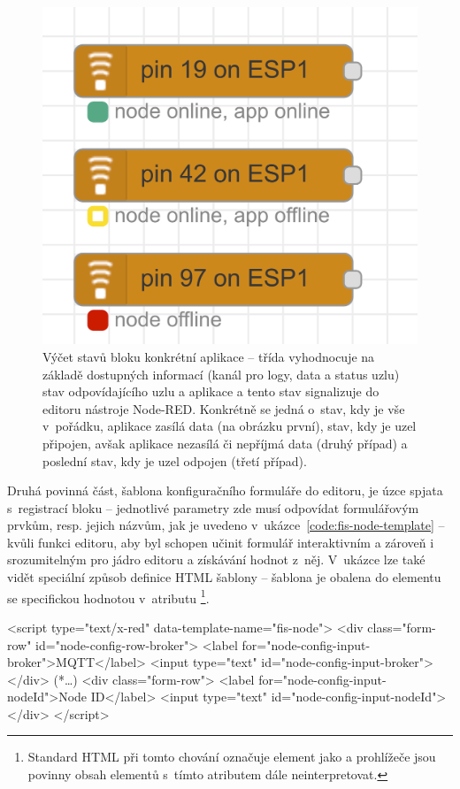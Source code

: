 \begin{figure}
    \centering
    \includegraphics[width=.5\textwidth]{figures/fis-node-status.png}
    \caption{Výčet stavů bloku konkrétní aplikace -- třída  vyhodnocuje na základě dostupných informací
    (kanál pro logy, data a status uzlu) stav odpovídajícího uzlu a aplikace a tento stav signalizuje do editoru
    nástroje Node-RED. Konkrétně se jedná o~stav, kdy je vše v~pořádku, aplikace zasílá data (na obrázku první),
    stav, kdy je uzel připojen, avšak aplikace nezasílá či nepříjmá data (druhý případ) a poslední stav,
    kdy je uzel odpojen (třetí případ).}
    \label{fig:fis-node-status}
\end{figure}

Druhá povinná část, šablona konfiguračního formuláře do editoru, je úzce spjata s~registrací bloku -- jednotlivé
parametry zde musí odpovídat formulářovým prvkům, resp. jejich názvům, jak je uvedeno
v~ukázce~\ref{code:fis-node-template} -- kvůli funkci editoru, aby byl schopen učinit
formulář interaktivním a zároveň i srozumitelným pro jádro editoru a získávání hodnot z~něj.
V~ukázce lze také vidět speciální způsob definice HTML šablony -- šablona je obalena do elementu  se
specifickou hodnotou v~atributu \footnote{Standard HTML při tomto chování označuje
element  jako  a prohlížeče jsou povinny obsah elementů s~tímto atributem dále
neinterpretovat.}.

\begin{code}[
    language=HTML,
    label=code:fis-node-template,
    caption={Ukázka z~implementace druhé povinné části deklarace bloku -- šablona formuláře v~jazyce HTML obsahuje
    jednotlivé vstupní pro pole pro korespondující parametry definovené v~registraci bloku do editoru
    v~ukázce~\ref{code:fis-node-constructor}.
    Atribut \ic{id="node-config-input-broker"} (a odpovídající) jsou důležité vzhledem k~chování editoru, nutná je shoda
    s~názvem parametru při registraci bloku -- stejně jako správné spárování šablony pomocí atributu
    \ic{data-template-name="fis-node"}.},
]
<script type="text/x-red" data-template-name="fis-node">
    <div class="form-row" id="node-config-row-broker">
        <label for="node-config-input-broker">MQTT</label>
        <input type="text" id="node-config-input-broker">
    </div>
    (*\ldots*)
    <div class="form-row">
        <label for="node-config-input-nodeId">Node ID</label>
        <input type="text" id="node-config-input-nodeId">
    </div>
</script>
\end{code}

